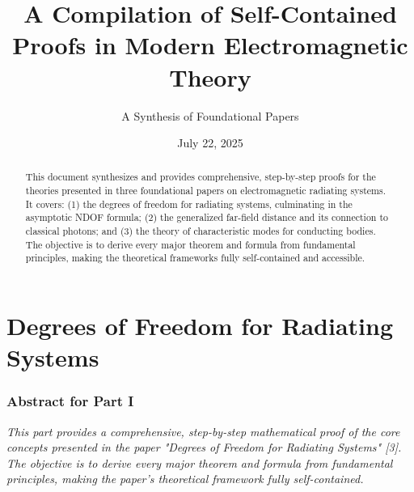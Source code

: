 \documentclass[11pt,a4paper]{article}
\begin{document}
\title{A Compilation of Self-Contained Proofs in Modern Electromagnetic Theory}
\author{A Synthesis of Foundational Papers}
\date{July 22, 2025}

\maketitle

\begin{abstract}
This document synthesizes and provides comprehensive, step-by-step proofs for the theories presented in three foundational papers on electromagnetic radiating systems. It covers: (1) the degrees of freedom for radiating systems, culminating in the asymptotic NDOF formula; (2) the generalized far-field distance and its connection to classical photons; and (3) the theory of characteristic modes for conducting bodies. The objective is to derive every major theorem and formula from fundamental principles, making the theoretical frameworks fully self-contained and accessible.
\end{abstract}

\tableofcontents
\newpage


\part{Degrees of Freedom for Radiating Systems}
\section*{Abstract for Part I}
\textit{This part provides a comprehensive, step-by-step mathematical proof of the core concepts presented in the paper "Degrees of Freedom for Radiating Systems" [3]. The objective is to derive every major theorem and formula from fundamental principles, making the paper's theoretical framework fully self-contained.}
\end{document}
